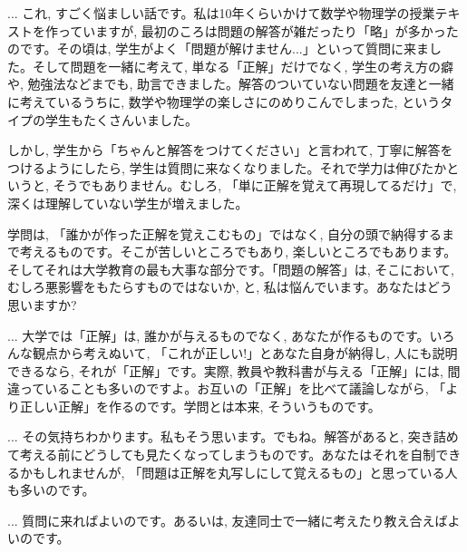 
\begin{faq}{\small{} ... 
これ, すごく悩ましい話です。私は10年くらいかけて数学や物理学の授業テキストを作っていますが, 最初のころは問題の解答が雑だったり「略」が多かったのです。その頃は, 学生がよく「問題が解けません...」といって質問に来ました。そして問題を一緒に考えて, 単なる「正解」だけでなく, 学生の考え方の癖や, 勉強法などまでも, 助言できました。解答のついていない問題を友達と一緒に考えているうちに, 数学や物理学の楽しさにのめりこんでしまった, というタイプの学生もたくさんいました。

しかし, 学生から「ちゃんと解答をつけてください」と言われて, 丁寧に解答をつけるようにしたら, 学生は質問に来なくなりました。それで学力は伸びたかというと, そうでもありません。むしろ, 「単に正解を覚えて再現してるだけ」で, 深くは理解していない学生が増えました。

学問は, 「誰かが作った正解を覚えこむもの」ではなく, 自分の頭で納得するまで考えるものです。そこが苦しいところでもあり, 楽しいところでもあります。そしてそれは大学教育の最も大事な部分です。「問題の解答」は, そこにおいて, むしろ悪影響をもたらすものではないか, と, 私は悩んでいます。あなたはどう思いますか?}\end{faq}

\begin{faq}{\small{} ... 
大学では「正解」は, 誰かが与えるものでなく, あなたが作るものです。いろんな観点から考えぬいて, 「これが正しい!」とあなた自身が納得し, 人にも説明できるなら, それが「正解」です。実際, 教員や教科書が与える「正解」には, 間違っていることも多いのですよ。お互いの「正解」を比べて議論しながら, 「より正しい正解」を作るのです。学問とは本来, そういうものです。}\end{faq}

\begin{faq}{\small{} ... 
その気持ちわかります。私もそう思います。でもね。解答があると, 突き詰めて考える前にどうしても見たくなってしまうものです。あなたはそれを自制できるかもしれませんが, 「問題は正解を丸写しにして覚えるもの」と思っている人も多いのです。}\end{faq}

\begin{faq}{\small{} ... 
質問に来ればよいのです。あるいは, 友達同士で一緒に考えたり教え合えばよいのです。}\end{faq}


